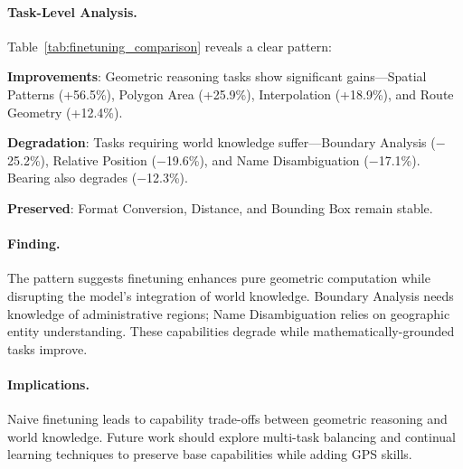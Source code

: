 \paragraph{Task-Level Analysis.}
Table~\ref{tab:finetuning_comparison} reveals a clear pattern:

\textbf{Improvements}: Geometric reasoning tasks show significant gains---Spatial Patterns (+56.5\%), Polygon Area (+25.9\%), Interpolation (+18.9\%), and Route Geometry (+12.4\%).

\textbf{Degradation}: Tasks requiring world knowledge suffer---Boundary Analysis ($-$25.2\%), Relative Position ($-$19.6\%), and Name Disambiguation ($-$17.1\%). Bearing also degrades ($-$12.3\%).

\textbf{Preserved}: Format Conversion, Distance, and Bounding Box remain stable.

\paragraph{Finding.}
The pattern suggests finetuning enhances pure geometric computation while disrupting the model's integration of world knowledge. Boundary Analysis needs knowledge of administrative regions; Name Disambiguation relies on geographic entity understanding. These capabilities degrade while mathematically-grounded tasks improve.

\paragraph{Implications.}
Naive finetuning leads to capability trade-offs between geometric reasoning and world knowledge. Future work should explore multi-task balancing and continual learning techniques to preserve base capabilities while adding GPS skills.

